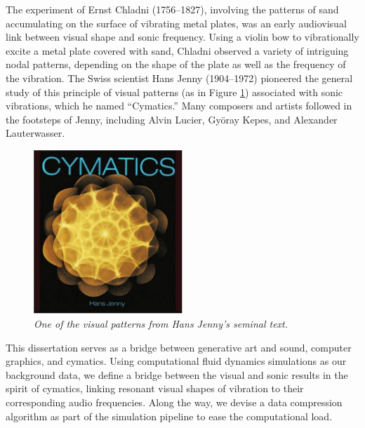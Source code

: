 The experiment of Ernst Chladni (1756--1827), involving the patterns of sand accumulating on the surface of vibrating metal plates, was an early audiovisual link between visual shape and sonic frequency. Using a violin bow to vibrationally excite a metal plate covered with sand, Chladni observed a variety of intriguing nodal patterns, depending on the shape of the plate as well as the frequency of the vibration. The Swiss scientist Hans Jenny (1904--1972) pioneered the general study of this principle of visual patterns (as in Figure \ref{fig:cymatics}) associated with sonic vibrations, which he named ``Cymatics.'' Many composers and artists followed in the footsteps of Jenny, including Alvin Lucier, Gy{\"o}ray Kepes, and Alexander Lauterwasser. 

\begin{figure}
\centering
\includegraphics[width=0.5\textwidth]{chap1/figures/cymatics.jpg}
\caption{\em One of the visual patterns from Hans Jenny's seminal text.}
\label{fig:cymatics}
\end{figure}

This dissertation serves as a bridge between generative art and sound, computer graphics, and cymatics. Using computational fluid dynamics simulations as our background data, we define a bridge between the visual
and sonic results in the spirit of cymatics, linking resonant visual shapes of vibration to their corresponding audio frequencies. Along the way, we devise a data compression algorithm as part of the simulation pipeline to
ease the computational load. 

